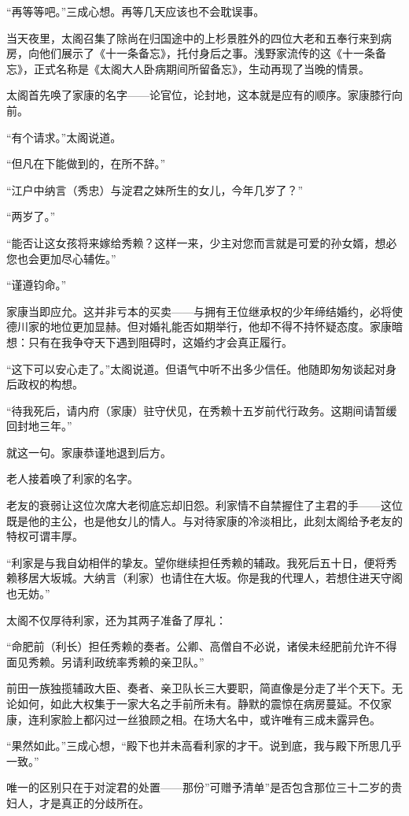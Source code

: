 \documentclass[
]{article}
\begin{document}
``再等等吧。''三成心想。再等几天应该也不会耽误事。

当天夜里，太阁召集了除尚在归国途中的上杉景胜外的四位大老和五奉行来到病房，向他们展示了《十一条备忘》，托付身后之事。浅野家流传的这《十一条备忘》，正式名称是《太阁大人卧病期间所留备忘》，生动再现了当晚的情景。

太阁首先唤了家康的名字------论官位，论封地，这本就是应有的顺序。家康膝行向前。

``有个请求。''太阁说道。

``但凡在下能做到的，在所不辞。''

``江户中纳言（秀忠）与淀君之妹所生的女儿，今年几岁了？''

``两岁了。''

``能否让这女孩将来嫁给秀赖？这样一来，少主对您而言就是可爱的孙女婿，想必您也会更加尽心辅佐。''

``谨遵钧命。''

家康当即应允。这并非亏本的买卖------与拥有王位继承权的少年缔结婚约，必将使德川家的地位更加显赫。但对婚礼能否如期举行，他却不得不持怀疑态度。家康暗想：只有在我争夺天下遇到阻碍时，这婚约才会真正履行。

``这下可以安心走了。''太阁说道。但语气中听不出多少信任。他随即匆匆谈起对身后政权的构想。

``待我死后，请内府（家康）驻守伏见，在秀赖十五岁前代行政务。这期间请暂缓回封地三年。''

就这一句。家康恭谨地退到后方。

老人接着唤了利家的名字。

老友的衰弱让这位次席大老彻底忘却旧怨。利家情不自禁握住了主君的手------这位既是他的主公，也是他女儿的情人。与对待家康的冷淡相比，此刻太阁给予老友的特权可谓丰厚。

``利家是与我自幼相伴的挚友。望你继续担任秀赖的辅政。我死后五十日，便将秀赖移居大坂城。大纳言（利家）也请住在大坂。你是我的代理人，若想住进天守阁也无妨。''

太阁不仅厚待利家，还为其两子准备了厚礼：

``命肥前（利长）担任秀赖的奏者。公卿、高僧自不必说，诸侯未经肥前允许不得面见秀赖。另请利政统率秀赖的亲卫队。''

前田一族独揽辅政大臣、奏者、亲卫队长三大要职，简直像是分走了半个天下。无论如何，如此大权集于一家大名之手前所未有。静默的震惊在病房蔓延。不仅家康，连利家脸上都闪过一丝狼顾之相。在场大名中，或许唯有三成未露异色。

``果然如此。''三成心想，``殿下也并未高看利家的才干。说到底，我与殿下所思几乎一致。''

唯一的区别只在于对淀君的处置------那份''可赠予清单''是否包含那位三十二岁的贵妇人，才是真正的分歧所在。
\end{document}
